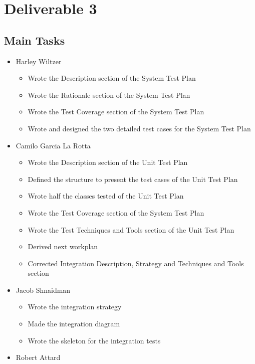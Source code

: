 \documentclass[12pt]{article}
\begin{document}
\newpage
 \section{Deliverable 3}
%
 \subsection{Main Tasks}
%
%
 \begin{itemize}
     \item Harley Wiltzer
    \begin{itemize}
        \item Wrote the Description section of the System Test Plan
        \item Wrote the Rationale section of the System Test Plan
        \item Wrote the Test Coverage section of the System Test Plan
        \item Wrote and designed the two detailed test cases for the System Test Plan
    \end{itemize}
     \item Camilo Garcia La Rotta
     \begin{itemize}
        \item Wrote the Description section of the Unit Test Plan
        \item Defined the structure to present the test cases of the Unit Test Plan
        \item Wrote half the classes tested of the Unit Test Plan
        \item Wrote the Test Coverage section of the System Test Plan
        \item Wrote the Test Techniques and Tools section of the Unit Test Plan
        \item Derived next workplan
        \item Corrected Integration Description, Strategy and Techniques and Tools section
     \end{itemize}
     \item Jacob Shnaidman
        \begin{itemize}
            \item Wrote the integration strategy
            \item Made the integration diagram
            \item Wrote the skeleton for the integration tests
        \end{itemize}
     \item Robert Attard

\end{itemize}
\end{document}
